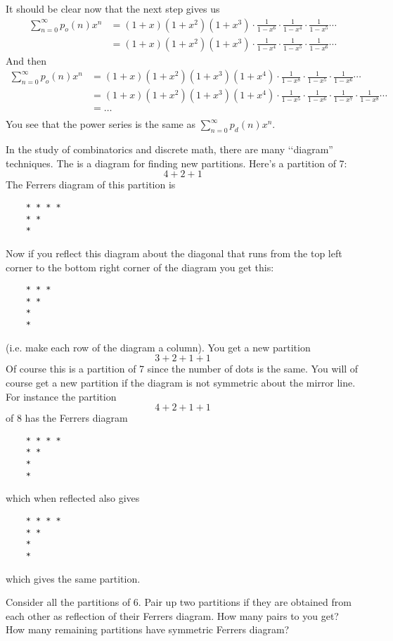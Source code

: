 It should be clear now that the next step gives us
\begin{align*}
\sum_{n=0}^\infty p_o(n) x^n 
&= (1+x)(1+x^2)(1+x^3) \cdot  \frac{1}{1 - x^6} \cdot \frac{1}{1 - x^4} \cdot \frac{1}{1 - x^5} \cdots  \\
&= (1+x)(1+x^2)(1+x^3) \cdot   \frac{1}{1 - x^4} \cdot \frac{1}{1 - x^5} \cdot \frac{1}{1 - x^6} \cdots 
\end{align*}
And then
\begin{align*}
\sum_{n=0}^\infty p_o(n) x^n 
&= (1+x)(1+x^2)(1+x^3)(1+x^4) \cdot \frac{1}{1 - x^8} \cdot \frac{1}{1 - x^5} \cdot \frac{1}{1 - x^6} \cdots \\
&= (1+x)(1+x^2)(1+x^3)(1+x^4) \cdot \frac{1}{1 - x^5} \cdot 
\frac{1}{1 - x^6} \cdot \frac{1}{1 - x^7} \cdot \frac{1}{1 - x^8} \cdots \\
&= \ldots \\
\end{align*}
You see that the power series is the same as $\sum_{n=0}^\infty p_d(n) x^n$.

In the study of combinatorics and discrete math, 
there are many \lq\lq diagram'' techniques.
The  is a diagram for finding new partitions.
Here's a partition of 7:
\[
4 + 2 + 1
\]
The Ferrers diagram of this partition is
\begin{verbatim}
    * * * *
    * * 
    *
\end{verbatim}
Now if you reflect this diagram about the diagonal
that runs from the top left corner
to the bottom right corner of the diagram 
you get this:
\begin{verbatim}
    * * * 
    * * 
    *
    *
\end{verbatim}
(i.e. make each row of the diagram a column).
You get a new partition
\[
3 + 2 + 1 + 1
\]
Of course this is a partition of 7 since the number of dots
is the same.
You will of course get a new partition if the diagram 
is not symmetric about the mirror line.
For instance the partition
\[
4 + 2 + 1 + 1
\]
of 8 has the Ferrers diagram
\begin{verbatim}
    * * * *
    * *
    *
    *
\end{verbatim}
which when reflected also gives
\begin{verbatim}
    * * * *
    * *
    *
    *
\end{verbatim}
which gives the same partition.


\newpage
\begin{ex}
Consider all the partitions of $6$.
Pair up two partitions if they are obtained from each other
as reflection of their Ferrers diagram.
How many pairs to you get?
How many remaining partitions have symmetric Ferrers diagram?
\end{ex}


